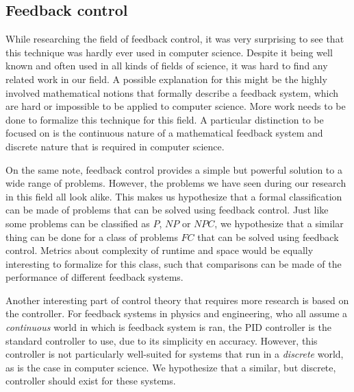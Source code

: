 \subsection*{Feedback control}
While researching the field of feedback control, it was very surprising to see that this technique was hardly ever used in computer science. Despite it being well known and often used in all kinds of fields of science, it was hard to find any related work in our field. A possible explanation for this might be the highly involved mathematical notions that formally describe a feedback system, which are hard or impossible to be applied to computer science. More work needs to be done to formalize this technique for this field. A particular distinction to be focused on is the continuous nature of a mathematical feedback system and discrete nature that is required in computer science.

On the same note, feedback control provides a simple but powerful solution to a wide range of problems. However, the problems we have seen during our research in this field all look alike. This makes us hypothesize that a formal classification can be made of problems that can be solved using feedback control. Just like some problems can be classified as $P$, $NP$ or $NPC$, we hypothesize that a similar thing can be done for a class of problems $FC$ that can be solved using feedback control. Metrics about complexity of runtime and space would be equally interesting to formalize for this class, such that comparisons can be made of the performance of different feedback systems.

Another interesting part of control theory that requires more research is based on the controller. For feedback systems in physics and engineering, who all assume a \textit{continuous} world in which is feedback system is ran, the PID controller is the standard controller to use, due to its simplicity en accuracy. However, this controller is not particularly well-suited for systems that run in a \textit{discrete} world, as is the case in computer science. We hypothesize that a similar, but discrete, controller should exist for these systems.
